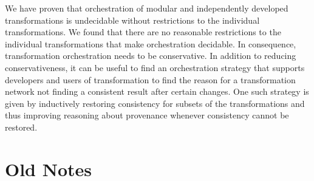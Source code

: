 \begin{insight}[Orchestration]
    We have proven that orchestration of modular and independently developed transformations is undecidable without restrictions to the individual transformations.
    We found that there are no reasonable restrictions to the individual transformations that make orchestration decidable.
    In consequence, transformation orchestration needs to be conservative.
    In addition to reducing conservativeness, it can be useful to find an orchestration strategy that supports developers and users of transformation to find the reason for a transformation network not finding a consistent result after certain changes.
    One such strategy is given by inductively restoring consistency for subsets of the transformations and thus improving reasoning about provenance whenever consistency cannot be restored.
\end{insight}




\section{Old Notes}




